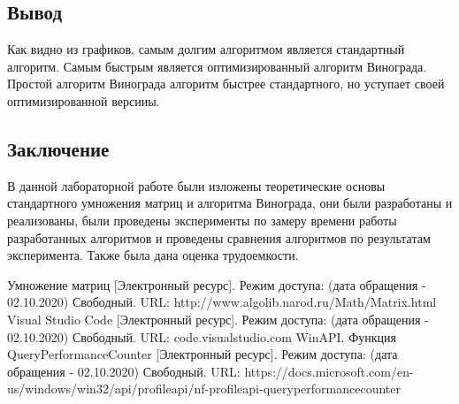 \documentclass{article}
\begin{document}
	 	\subsection{Вывод}
	Как видно из графиков, самым долгим алгоритмом является стандартный алгоритм. Самым быстрым является оптимизированный алгоритм Винограда. Простой алгоритм Винограда алгоритм быстрее стандартного, но уступает своей оптимизированной версииы.
	\newpage
	\begin{center}
		\section*{Заключение}
	\end{center}
	\indent \indent В данной лабораторной работе были изложены теоретические основы стандартного умножения матриц и алгоритма Винограда, они были разработаны и реализованы, были проведены эксперименты по замеру времени работы разработанных алгоритмов и проведены сравнения алгоритмов по результатам эксперимента. Также была дана оценка трудоемкости.
	\newpage
	
	\begin{center}
	\begin{thebibliography}{3}
	Умножение матриц [Электронный ресурс]. Режим доступа: (дата обращения - 02.10.2020) Свободный. URL: http://www.algolib.narod.ru/Math/Matrix.html
	Visual Studio Code [Электронный ресурс]. Режим доступа: (дата обращения - 02.10.2020) Свободный. URL: code.visualstudio.com
		WinAPI. Функция QueryPerformanceCounter [Электронный ресурс]. Режим доступа: (дата обращения - 02.10.2020) Свободный. URL: https://docs.microsoft.com/en-us/windows/win32/api/profileapi/nf-profileapi-queryperformancecounter
	\end{thebibliography}
	\end{center}
\end{document}
